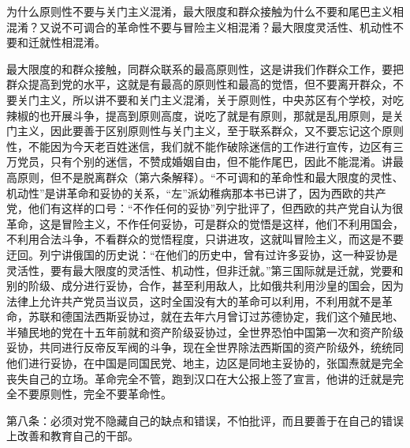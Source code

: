 为什么原则性不要与关门主义混淆，最大限度和群众接触为什么不要和尾巴主义相混淆？又说不可调合的革命性不要与冒险主义相混淆？最大限度灵活性、机动性不要和迁就性相混淆。

最大限度的和群众接触，同群众联系的最高原则性，这是讲我们作群众工作，要把群众提高到党的水平，这就是有最高的原则性和最高的觉悟，但不要离开群众，不要关门主义，所以讲不要和关门主义混淆，关于原则性，中央苏区有个学校，对吃辣椒的也开展斗争，提高到原则高度，说吃了就是有原则，那就是乱用原则，是关门主义，因此要善于区别原则性与关门主义，至于联系群众，又不要忘记这个原则性，不能因为今天老百姓迷信，我们就不能作破除迷信的工作进行宣传，边区有三万党员，只有个别的迷信，不赞成婚姻自由，但不能作尾巴，因此不能混淆。讲最高原则，但不是脱离群众（第六条解释）。“不可调和的革命性和最大限度的灵性、机动性”是讲革命和妥协的关系，“左”派幼稚病那本书已讲了，因为西欧的共产党，他们有这样的口号：“不作任何的妥协”列宁批评了，但西欧的共产党自认为很革命，这是冒险主义，不作任何妥协，可是群众的觉悟是这样，他们不利用国会，不利用合法斗争，不看群众的觉悟程度，只讲进攻，这就叫冒险主义，而这是不要迂回。列宁讲俄国的历史说：“在他们的历史中，曾有过许多妥协，这一种妥协是灵活性，要有最大限度的灵活性、机动性，但非迁就。”第三国际就是迁就，党要和别的阶级、成分进行妥协，合作，甚至利用敌人，比如俄共利用沙皇的国会，因为法律上允许共产党员当议员，这时全国没有大的革命可以利用，不利用就不是革命，苏联和德国法西斯妥协过，就在去年六月曾订过苏德协定，我们这个殖民地、半殖民地的党在十五年前就和资产阶级妥协过，全世界恐怕中国第一次和资产阶级妥协，共同进行反帝反军阀的斗争，现在全世界除法西斯国的资产阶级外，统统同他们进行妥协，在中国是同国民党、地主，边区是同地主妥协的，张国焘就是完全丧失自己的立场。革命完全不管，跑到汉口在大公报上签了宣言，他讲的迁就是完全不要原则性，完全不要革命性。

第八条：必须对党不隐藏自己的缺点和错误，不怕批评，而且要善于在自己的错误上改善和教育自己的干部。

